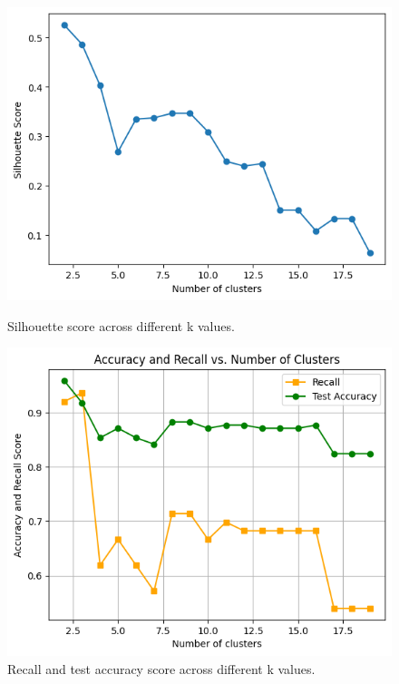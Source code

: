 \documentclass[a4paper,12pt]{article}
\begin{document}
\begin{figure}[H]
    \centering
    \begin{minipage}[t]{0.48\textwidth}
        \centering
        \includegraphics[width=\textwidth]{imgs/silhouette.png}
        \caption{Silhouette score across different k values.}
        \label{fig:silhouette}
    \end{minipage}
    \hfill
    \begin{minipage}[t]{0.48\textwidth}
        \centering
        \includegraphics[width=\textwidth]{imgs/recall_test_acc.png}
        \caption{Recall and test accuracy score across different k values.}
        \label{fig:recall_test_acc}
    \end{minipage}
\end{figure}
\end{document}
